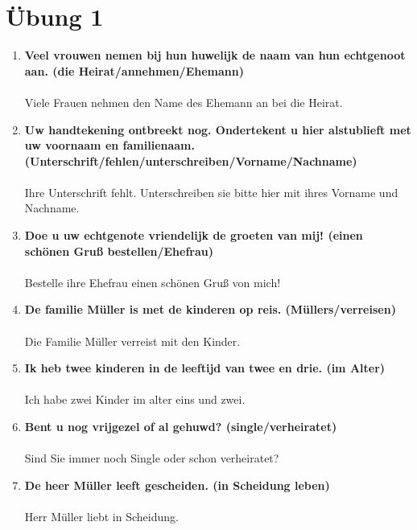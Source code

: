 \documentclass[main.tex]{subfiles}
\begin{document}
\section{Übung 1}
\begin{enumerate}
\item \textbf{Veel vrouwen nemen bij hun huwelijk de naam van hun echtgenoot aan. (die Heirat/annehmen/Ehemann)}\\ \\
Viele Frauen nehmen den Name des Ehemann an bei die Heirat.\\
\item \textbf{Uw handtekening ontbreekt nog. Ondertekent u hier alstublieft met uw voornaam en familienaam. (Unterschrift/fehlen/unterschreiben/Vorname/Nachname)}\\ \\
Ihre Unterschrift fehlt. Unterschreiben sie bitte hier mit ihres Vorname und Nachname.
\\
\item \textbf{Doe u uw echtgenote vriendelijk de groeten van mij! (einen schönen Gruß bestellen/Ehefrau)}\\ \\
Bestelle ihre Ehefrau einen schönen Gruß von mich!
\\
\item \textbf{De familie Müller is met de kinderen op reis. (Müllers/verreisen)}\\ \\
Die Familie Müller verreist mit den Kinder.
\\
\item \textbf{Ik heb twee kinderen in de leeftijd van twee en drie. (im Alter)}\\ \\
Ich habe zwei Kinder im alter eins und zwei.
\\
\item \textbf{Bent u nog vrijgezel of al gehuwd? (single/verheiratet)}\\ \\
Sind Sie immer noch Single oder schon verheiratet?
\\
\item \textbf{De heer Müller leeft gescheiden. (in Scheidung leben)}\\ \\
Herr Müller liebt in Scheidung.

\end{enumerate}
\end{document}
